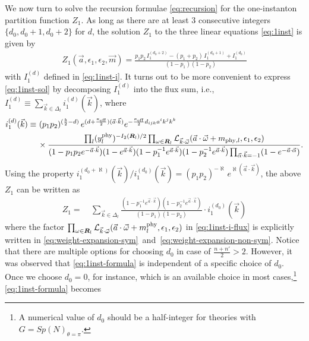 \documentclass[letterpaper, 11pt]{article}
\newcommand{\nn}{\nonumber}
\def\CL{{\cal L}}
\def\e{\epsilon}
\def\w{\omega}
\begin{document}
{We now turn to solve the recursion formulae \eqref{eq:recursion} for the one-instanton partition function $Z_1$. As long as there are at least 3 consecutive integers $\{d_0, d_0+1, d_0+2\}$ for $d$, the solution $Z_1$ to the three linear equations \eqref{eq:1inst} is given by
\begin{align}
  \label{eq:1inst-sol}
  Z_1(\vec{a},\e_1,\e_2, \vec{m})=\frac{p_1p_2\,I_{1}^{(d_0+2)}-(p_1+p_2)\,I_{1}^{(d_0+1)}+I_{1}^{(d_0)}}{(1-p_1)(1-p_2)}
\end{align}
with $I_1^{(d)}$ defined in \eqref{eq:1inst-i}. It turns out to be more convenient to express \eqref{eq:1inst-sol} by decomposing $I_1^{(d)}$ into the flux sum, i.e., $I_1^{(d)} \equiv \sum_{\vec{k}\in\Delta_{l}} i_1^{(d)}(\vec{k})$, where
\begin{align}
  \label{eq:1inst-i-flux}
  i_{1}^{(d)}(\vec{k})\equiv &\ (p_1p_2)^{(\frac{b}{2}-d)}\,e^{(d+\frac{\kappa_{\text{eff}}}{2})(\vec{a}\cdot\vec{k})}e^{-\frac{\kappa_{\text{eff}}}{2}d_{ijk}a^ik^jk^k}\\
  &\,\times\frac{\prod_{l}(y_{l}^{\text{phy}})^{-{I_2(\boldsymbol{R}_l)}/{2}}\prod_{\w \in \boldsymbol{R}_l} \CL_{\vec{k}\cdot\vec{\w}}(\vec{a}\cdot \vec{\w} + m_{\text{phy},l}, \e_1,\e_2)}{(1-p_1p_2e^{-\vec{a}\cdot\vec{k}})(1-e^{\vec{a}\cdot\vec{k}})(1-p_1^{-1}e^{\vec{a}\cdot\vec{k}})(1-p_2^{-1}e^{\vec{a}\cdot\vec{k}})\prod_{\vec{\alpha}\cdot \vec{k}=-1}(1-e^{-\vec{a}\cdot\vec{\alpha}})}.\nn
\end{align}
Using the property $i_{1}^{(d_0+\aleph)}(\vec{k}) /i_{1}^{(d_0)}(\vec{k})=(p_1p_2)^{-\aleph}\,e^{\aleph(\vec{a}\cdot\vec{k})}$, the above $Z_1$ can be written as
\begin{align}
  \label{eq:1inst-formula}
  Z_1=&\ \sum_{\vec{k}\in\Delta_l}\frac{(1-p_1^{-1}e^{\vec{a}\cdot\vec{k}})(1-p_2^{-1}e^{\vec{a}\cdot\vec{k}})}{(1-p_1)(1-p_2)}
  \cdot i_1^{(d_0)}(\vec{k}) 
\end{align}
where the factor $\prod_{\w \in \boldsymbol{R}_l} \CL_{\vec{k}\cdot\vec{\w}}(\vec{a}\cdot \vec{\w} + m_{l}^\text{phy}, \e_{1}, \e_{2})$ in \eqref{eq:1inst-i-flux} is explicitly written in \eqref{eq:weight-expansion-sym}~and~\eqref{eq:weight-expansion-non-sym}. Notice that there are multiple options for choosing $d_0$ in case of $\frac{n+n'}{2} > 2$. However, it was observed that \eqref{eq:1inst-formula} is independent of a specific choice of $d_0$. Once we choose $d_0 = 0$, for instance, which is an available choice in most cases,\footnote{A numerical value of $d_0$ should be a half-integer for theories with $G = Sp(N)_{\theta=\pi}$.} \eqref{eq:1inst-formula} becomes
}
\end{document}
